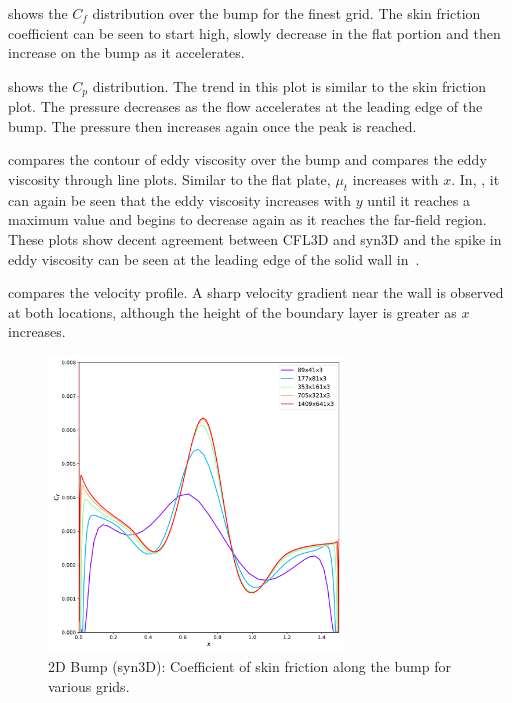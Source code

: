  shows the $C_f$ distribution over the bump for the finest grid. The skin friction coefficient can be seen to start high, slowly decrease in the flat portion and then increase on the bump as it accelerates. 

 shows the $C_p$ distribution. The trend in this plot is similar to the skin friction plot. The pressure decreases as the flow accelerates at the leading edge of the bump. The pressure then increases again once the peak is reached. 

 compares the contour of eddy viscosity over the bump and  compares the eddy viscosity through line plots. Similar to the flat plate, $\mu_t$ increases with $x$. In, , it can again be seen that the eddy viscosity increases with $y$ until it reaches a maximum value and begins to decrease again as it reaches the far-field region.
These plots show decent agreement between CFL3D and syn3D and the spike in eddy viscosity can be seen at the leading edge of the solid wall in~. 

 compares the velocity profile. A sharp velocity gradient near the wall is observed at both locations, although the height of the boundary layer is greater as $x$ increases. 
\begin{figure}[ht!]
\centering
  \includegraphics[width=0.7\textwidth]{figs/2dbump/CfGridStudy.pdf}
    \caption{2D Bump (syn3D): Coefficient of skin friction along the bump for various grids.}
    \label{fig:syn2dbumpcfstudy}
\end{figure}

